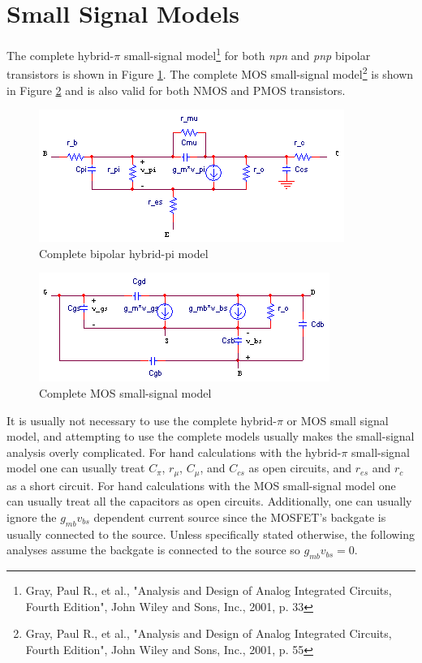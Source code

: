 \section*{Small Signal Models}
The complete hybrid-$\pi$ small-signal model\footnote{Gray, Paul R., et al., "Analysis and Design of Analog Integrated Circuits, Fourth Edition", John Wiley and Sons, Inc., 2001, p. 33} for both \textit{npn} and \textit{pnp} bipolar transistors is shown in Figure \ref{fig:complete_bipolar_hybrid_pi}. The complete MOS small-signal model\footnote{Gray, Paul R., et al., "Analysis and Design of Analog Integrated Circuits, Fourth Edition", John Wiley and Sons, Inc., 2001, p. 55} is shown in Figure \ref{fig:complete_MOS_ss_model} and is also valid for both NMOS and PMOS transistors.
\begin{figure}[h]
	\centering
		\includegraphics{schematics/complete_bipolar_hybrid_pi.PNG}
	\caption{Complete bipolar hybrid-pi model}
	\label{fig:complete_bipolar_hybrid_pi}
\end{figure}
\begin{figure}[h]
	\centering
		\includegraphics{schematics/complete_MOS_ss_model.PNG}
	\caption{Complete MOS small-signal model}
	\label{fig:complete_MOS_ss_model}
\end{figure}
\par
It is usually not necessary to use the complete hybrid-$\pi$ or MOS small signal model, and attempting to use the complete models usually makes the small-signal analysis overly complicated. For hand calculations with the hybrid-$\pi$ small-signal model one can usually treat $C_{\pi}$, $r_{\mu}$, $C_{\mu}$, and $C_{cs}$ as open circuits, and $r_{es}$ and $r_{c}$ as a short circuit. For hand calculations with the MOS small-signal model one can usually treat all the capacitors as open circuits. Additionally, one can usually ignore the $g_{mb}v_{bs}$ dependent current source since the MOSFET's backgate is usually connected to the source. Unless specifically stated otherwise, the following analyses assume the backgate is connected to the source so $g_{mb}v_{bs} = 0$.

